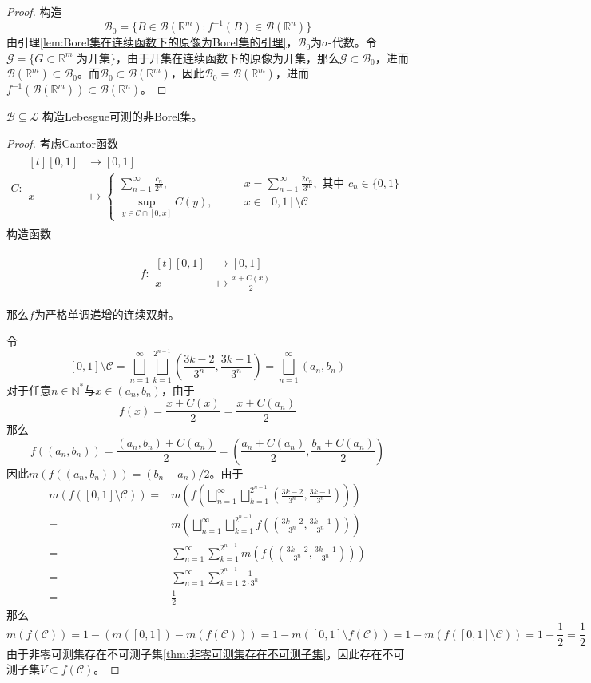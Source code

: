 \documentclass[lang = cn, scheme = chinese, thmcnt = section]{elegantbook}
\newcommand{\N}{\mathbb{N}}            %
\newcommand{\R}{\mathbb{R}}            %
\newcommand{\sub}{\subset}             %
\newcommand{\dis}{\displaystyle}
\newcommand{\function}[5]{
	\begin{align*}
		#1:\begin{aligned}[t]
			#2 &\longrightarrow #3\\
			#4 &\longmapsto #5
		\end{aligned}
	\end{align*}
}                                     %
\begin{document}
\begin{proof}
	构造
	$$
	\mathscr{B}_0=\{ B\in \mathscr{B}(\R^m):f^{-1}(B)\in \mathscr{B}(\R^n) \}
	$$
	由引理\ref{lem:Borel集在连续函数下的原像为Borel集的引理}，$\mathscr{B}_0$为$\sigma$-代数。令$\mathscr{G}=\{ G\sub\R^m\text{ 为开集} \}$，由于开集在连续函数下的原像为开集，那么$\mathscr{G}\sub \mathscr{B}_0$，进而$\mathscr{B}(\R^m)\sub \mathscr{B}_0$。而$\mathscr{B}_0\sub \mathscr{B}(\R^m)$，因此$\mathscr{B}_0=\mathscr{B}(\R^m)$，进而$f^{-1}(\mathscr{B}(\R^m))\sub \mathscr{B}(\R^n)$。
\end{proof}

\begin{theorem}{$\mathscr{B}\subsetneq\mathscr{L}$}
	构造Lebesgue可测的非Borel集。
\end{theorem}

\begin{proof}
	考虑Cantor函数
	\begin{align*}
		C:\begin{aligned}[t]
			[0,1] &\longrightarrow [0,1]\\
			x &\longmapsto \begin{cases}
				\dis\sum_{n=1}^{\infty}\frac{c_n}{2^n},\qquad &\dis x=\sum_{n=1}^{\infty}\frac{2c_n}{3^n},\text{ 其中 }c_n\in\{0,1\}\\
				\dis\sup_{y\in \mathcal{C}\cap[0,x]}C(y),\qquad &  x\in [0,1]\setminus\mathcal{C}
			\end{cases}
		\end{aligned}
	\end{align*}
	构造函数%
	\function{f}{[0,1]}{[0,1]}{x}{\frac{x+C(x)}{2}}
	那么$f$为严格单调递增的连续双射。
	
	令
	$$
	[0,1]\setminus\mathcal{C}=\bigsqcup_{n=1}^{\infty}\bigsqcup_{k=1}^{2^{n-1}}\left(\frac{3k-2}{3^n},\frac{3k-1}{3^n}\right)=\bigsqcup_{n=1}^{\infty}(a_n,b_n)
	$$
	对于任意$n\in\N^*$与$x\in (a_n,b_n)$，由于%
	$$
	f(x)=\frac{x+C(x)}{2}=\frac{x+C(a_n)}{2}
	$$
	那么%
	$$
	f((a_n,b_n))=\frac{(a_n,b_n)+C(a_n)}{2}=\left(\frac{a_n+C(a_n)}{2},\frac{b_n+C(a_n)}{2}\right)
	$$
	因此$m(f((a_n,b_n)))=(b_n-a_n)/2$。由于
	\begin{align*}
		m(f([0,1]\setminus\mathcal{C}))
		=& m\left(f\left(\bigsqcup_{n=1}^{\infty}\bigsqcup_{k=1}^{2^{n-1}}\left(\frac{3k-2}{3^n},\frac{3k-1}{3^n}\right)\right)\right)\\
		=&m\left(\bigsqcup_{n=1}^{\infty}\bigsqcup_{k=1}^{2^{n-1}}f\left(\left(\frac{3k-2}{3^n},\frac{3k-1}{3^n}\right)\right)\right)\\
		=& \sum_{n=1}^{\infty}\sum_{k=1}^{2^{n-1}}m\left(f\left(\left(\frac{3k-2}{3^n},\frac{3k-1}{3^n}\right)\right)\right)\\
		=& \sum_{n=1}^{\infty}\sum_{k=1}^{2^{n-1}}\frac{1}{2\cdot 3^n}\\
		=&\frac{1}{2}
	\end{align*}
	那么%
	$$
	m(f(\mathcal{C}))
	=1-(m([0,1])-m(f(\mathcal{C})))
	=1-m([0,1]\setminus f(\mathcal{C}))
	=1-m(f([0,1]\setminus\mathcal{C}))
	=1-\frac{1}{2}
	=\frac{1}{2}
	$$
	由于非零可测集存在不可测子集\ref{thm:非零可测集存在不可测子集}，因此存在不可测子集$V\sub f(\mathcal{C})$。
	

\end{proof}
\end{document}

